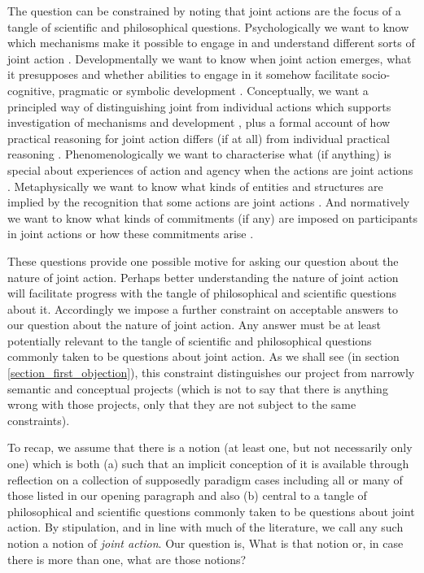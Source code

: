 \documentclass[12pt,a4paper]{extarticle}
\begin{document}
The question can be constrained by noting that joint actions are the focus of a tangle of scientific and philosophical questions.  Psychologically we want to know which mechanisms make it possible to engage in and understand different sorts of joint action
\citep{vesper_minimal_2010}.  
Developmentally we want to know when joint action emerges, what it presupposes and whether abilities to engage in it somehow facilitate socio-cognitive, pragmatic or symbolic development \citep{Moll:2007gu,Hughes:2004zj,Brownell:2006gu}.  
Conceptually, we want a principled way of distinguishing joint from individual actions which supports investigation of mechanisms and development \citep{Bratman:2009lv}, plus a formal account of how practical reasoning for joint action differs (if at all) from individual practical reasoning \citep{Sugden:2000mw,Gold:2007zd}.  
Phenomenologically we want to characterise what (if anything) is special about experiences of action and agency when the actions are joint actions \citep{Pacherie:2010fk}.  
Metaphysically we want to know what kinds of entities and structures are implied by the recognition that some actions are joint actions \citep{Gilbert:1992rs,Searle:1994lb}.  
And normatively we want to know what kinds of commitments (if any) are imposed on participants in joint actions or how these commitments arise \citep{Roth:2004ki}.

These questions provide one possible motive for asking our question about the nature of joint action.
Perhaps better understanding the nature of joint action will facilitate  progress with the tangle of philosophical and scientific questions about it.
Accordingly we impose a further constraint on acceptable answers to our question about the nature of joint action.
Any answer  must be at least potentially relevant to the tangle of scientific and philosophical questions commonly taken to be questions about joint action.
As we shall see (in section \vref{section_first_objection}), 
this constraint distinguishes our project from narrowly semantic and conceptual projects (which is not to say that there is anything wrong with those projects, only that they are not subject to the same constraints).

To recap, we assume that there is a notion (at least one, but not necessarily only one) which is both 
	(a) such that an implicit conception of it is available through reflection on a collection of supposedly paradigm cases including all or many of those listed in our opening paragraph
	and also 
	(b) central to a tangle of philosophical and scientific questions  commonly taken to be questions about joint action.
{By stipulation, and in line with much of the literature, we call any such notion a notion of \emph{joint action}.
\label{df_joint_action}}
Our question is, What is that notion or, in case there is more than one, what are those notions?  
\end{document}
